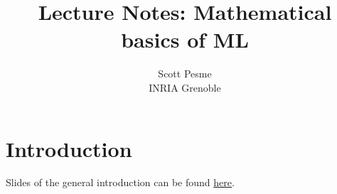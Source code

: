 \documentclass[11pt]{article}
\title{Lecture Notes: Mathematical basics of ML}
\author{Scott Pesme \\ \small INRIA Grenoble}
\begin{document}
\maketitle
\tableofcontents

\newpage

\section{Introduction}
Slides of the general introduction can be found \href{https://kernel-learning.github.io/docs/Intro-2026-2027.pdf}{here}.


\newpage


\newpage


\newpage


\newpage


% 

\newpage


% 

\newpage


\newpage
\appendix


\end{document}
